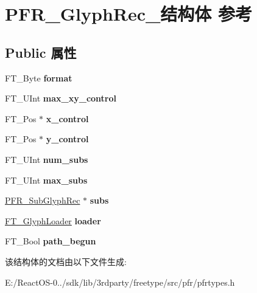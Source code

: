 \hypertarget{struct_p_f_r___glyph_rec__}{}\section{P\+F\+R\+\_\+\+Glyph\+Rec\+\_\+结构体 参考}
\label{struct_p_f_r___glyph_rec__}
\subsection*{Public 属性}
\begin{DoxyCompactItemize}
\item 
\mbox{\label{struct_p_f_r___glyph_rec___abc5d58759c32e126818c4d3fb82a96f7}} 
F\+T\+\_\+\+Byte {\bfseries format}
\item 
\mbox{\label{struct_p_f_r___glyph_rec___a969e9238b68a5321b8553515386440f4}} 
F\+T\+\_\+\+U\+Int {\bfseries max\+\_\+xy\+\_\+control}
\item 
\mbox{\label{struct_p_f_r___glyph_rec___a6695ea0913556d961cd18f4446b27e2d}} 
F\+T\+\_\+\+Pos $\ast$ {\bfseries x\+\_\+control}
\item 
\mbox{\label{struct_p_f_r___glyph_rec___a0447ff5f7e7323bca9a5f92374a65387}} 
F\+T\+\_\+\+Pos $\ast$ {\bfseries y\+\_\+control}
\item 
\mbox{\label{struct_p_f_r___glyph_rec___a7a4c4722bf34e3a355985f94d2614837}} 
F\+T\+\_\+\+U\+Int {\bfseries num\+\_\+subs}
\item 
\mbox{\label{struct_p_f_r___glyph_rec___a9dba53fa35c00001fdfe424a3ab269d2}} 
F\+T\+\_\+\+U\+Int {\bfseries max\+\_\+subs}
\item 
\mbox{\label{struct_p_f_r___glyph_rec___a1aa321e8408562c0c5803441e6609699}} 
\hyperlink{struct_p_f_r___sub_glyph_rec__}{P\+F\+R\+\_\+\+Sub\+Glyph\+Rec} $\ast$ {\bfseries subs}
\item 
\mbox{\label{struct_p_f_r___glyph_rec___a514784514c48497b58873de506841aba}} 
\hyperlink{struct_f_t___glyph_loader_rec__}{F\+T\+\_\+\+Glyph\+Loader} {\bfseries loader}
\item 
\mbox{\label{struct_p_f_r___glyph_rec___afcd62048c445167a6f8548da5ea60227}} 
F\+T\+\_\+\+Bool {\bfseries path\+\_\+begun}
\end{DoxyCompactItemize}


该结构体的文档由以下文件生成\+:\begin{DoxyCompactItemize}
\item 
E\+:/\+React\+O\+S-\/0../sdk/lib/3rdparty/freetype/src/pfr/pfrtypes.\+h\end{DoxyCompactItemize}
